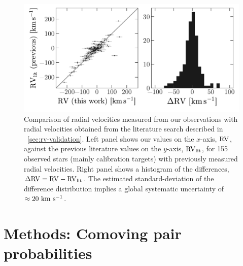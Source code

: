\documentclass[modern, letterpaper]{aastex61}
\begin{document}
\begin{figure}[!ht]
  \begin{center}
    \includegraphics[width=\linewidth]{rv-comparison.pdf}
  \end{center}
  \caption{%
    Comparison of radial velocities measured from our observations with radial
    velocities obtained from the literature search described in
    \sectionname~\ref{sec:rv-validation}.
    Left panel shows our values on the $x$-axis, ${\rm RV}$, against the
    previous literature values on the $y$-axis, ${\rm RV}_{\rm lit}$, for 155
    observed stars (mainly calibration targets) with previously measured radial
    velocities.
    Right panel shows a histogram of the differences, $\Delta{\rm RV} = {\rm RV}
    - {\rm RV}_{\rm lit}$.
    The estimated standard-deviation of the difference distribution implies a
    global systematic uncertainty of $\approx 20~\mathrm{km}~\mathrm{s}^{-1}$.
    \label{fig:compare-previous}}
\end{figure}

\section{Methods: Comoving pair probabilities}\label{sec:pair-probs}

\end{document}
